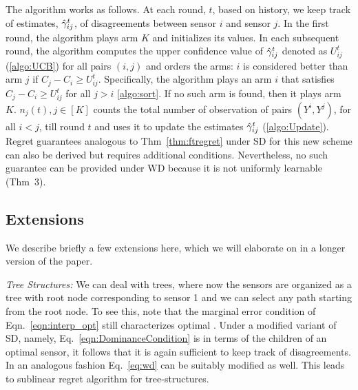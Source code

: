 The algorithm works as follows. At each round, $t$, based on history, we keep track of estimates, $\hat{\gamma}^t_{ij}$, of disagreements between sensor $i$ and sensor $j$.  %
In the first round, the algorithm plays arm $K$ and initializes its values. In each subsequent round, the algorithm computes the upper confidence value of $\hat{\gamma}^t_{ij}$ denoted as $U^t_{ij}$ (\ref{algo:UCB}) for all pairs $(i,j)$ and orders the arms: $i$ is considered better than arm $j$ if $C_j-C_i \geq U^t_{ij}$. Specifically, the algorithm plays an arm $i$ that satisfies $C_j-C_i \geq U^t_{ij}$ for all $j>i$ \ref{algo:sort}. If no such arm is found, then it plays arm $K$.  $n_j(t), j\in [K] $ counts the total number of observation of pairs $(Y^i, Y^j)$, for all $i<j$, till round $t$ and uses it to update the estimates $\hat{\gamma}_{ij}^t$ (\ref{algo:Update}). Regret guarantees analogous to Thm~\ref{thm:ftregret} under SD for this new scheme can also be derived but requires additional conditions. Nevertheless, no such guarantee can be provided under WD because it is not uniformly learnable (Thm~3). 
\vspace{-5pt}
%
\subsection{Extensions} 
We describe briefly a few extensions here, which we will elaborate on in a longer version of the paper.

\noindent
{\it Tree Structures:}
We can deal with trees, where now the sensors are organized as a tree with root node corresponding to sensor 1 and we can select any path starting from the root node. To see this, note that the marginal error condition of Eqn.~\ref{eqn:interp_opt} still characterizes optimal \ses. Under a modified variant of SD, namely, Eq.~\ref{eqn:DominanceCondition} is in terms of the children of an optimal sensor, it follows that it is again sufficient to keep track of disagreements. In an analogous fashion Eq.~\ref{eq:wd} can be suitably modified as well. This leads to sublinear regret algorithm for tree-structures. %


